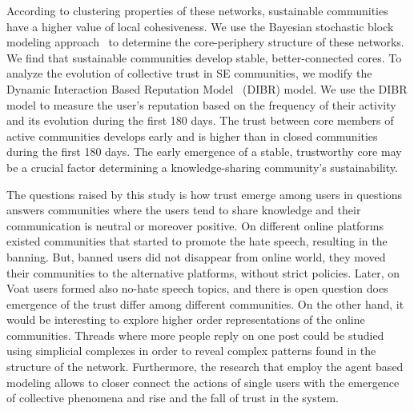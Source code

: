 According to clustering properties of these networks, sustainable communities have a higher value of local cohesiveness. We use the Bayesian stochastic block modeling approach~\cite{gallagher2020clarified} to determine the core-periphery structure of these networks. We find that sustainable communities develop stable, better-connected cores. To analyze the evolution of collective trust in SE communities, we modify the Dynamic Interaction Based Reputation Model~\cite{melnikov2018toward} (DIBR) model. We use the DIBR model to measure the user's reputation based on the frequency of their activity and its evolution during the first 180 days. The trust between core members of active communities develops early and is higher than in closed communities during the first 180 days. The early emergence of a stable, trustworthy core may be a crucial factor determining a knowledge-sharing community's sustainability. 

The questions raised by this study is how trust emerge among users in questions answers communities where the users tend to share knowledge and their communication is neutral or moreover positive. On different online platforms existed communities that started to promote the hate speech, resulting in the banning. But, banned users did not disappear from online world, they moved their communities to the alternative platforms, without strict policies. Later, on Voat users formed also no-hate speech topics, and there is open question does emergence of the trust differ among different communities. On the other hand, it would be interesting to explore higher order representations of the online communities. Threads where more people reply on one post could be studied using simplicial complexes in order to reveal complex patterns found in the structure of the network. Furthermore, the research that employ the agent based modeling allows to closer connect the actions of single users with the emergence of collective phenomena and rise and the fall of trust in the system. 






{}\selectfont


	

